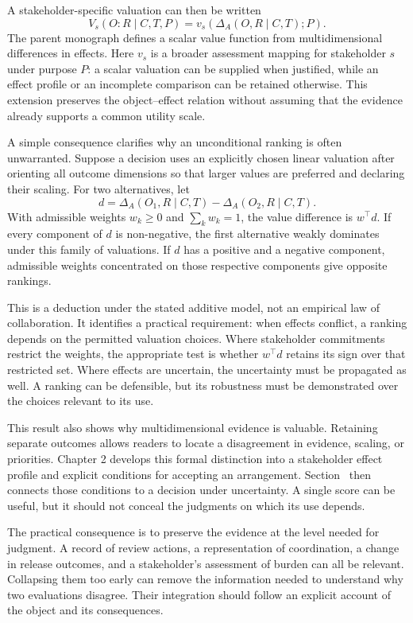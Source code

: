 A stakeholder-specific valuation can then be written
\begin{equation}
V_s(O:R\mid C,T,P)
 =v_s\!\left(\Delta_A(O,R\mid C,T);P\right).
\label{eq:value}
\end{equation}
The parent monograph defines a scalar value function from multidimensional differences in effects. Here \(v_s\) is a broader assessment mapping for stakeholder \(s\) under purpose \(P\): a scalar valuation can be supplied when justified, while an effect profile or an incomplete comparison can be retained otherwise. This extension preserves the object--effect relation without assuming that the evidence already supports a common utility scale.

A simple consequence clarifies why an unconditional ranking is often unwarranted. Suppose a decision uses an explicitly chosen linear valuation after orienting all outcome dimensions so that larger values are preferred and declaring their scaling. For two alternatives, let
\[
d=\Delta_A(O_1,R\mid C,T)-\Delta_A(O_2,R\mid C,T).
\]
With admissible weights \(w_k\geq0\) and \(\sum_k w_k=1\), the value difference is \(w^\top d\). If every component of \(d\) is non-negative, the first alternative weakly dominates under this family of valuations. If \(d\) has a positive and a negative component, admissible weights concentrated on those respective components give opposite rankings.

This is a deduction under the stated additive model, not an empirical law of collaboration. It identifies a practical requirement: when effects conflict, a ranking depends on the permitted valuation choices. Where stakeholder commitments restrict the weights, the appropriate test is whether \(w^\top d\) retains its sign over that restricted set. Where effects are uncertain, the uncertainty must be propagated as well. A ranking can be defensible, but its robustness must be demonstrated over the choices relevant to its use.

This result also shows why multidimensional evidence is valuable. Retaining separate outcomes allows readers to locate a disagreement in evidence, scaling, or priorities. Chapter 2 develops this formal distinction into a stakeholder effect profile and explicit conditions for accepting an arrangement. Section~ then connects those conditions to a decision under uncertainty. A single score can be useful, but it should not conceal the judgments on which its use depends.


The practical consequence is to preserve the evidence at the level needed for judgment. A record of review actions, a representation of coordination, a change in release outcomes, and a stakeholder's assessment of burden can all be relevant. Collapsing them too early can remove the information needed to understand why two evaluations disagree. Their integration should follow an explicit account of the object and its consequences.

